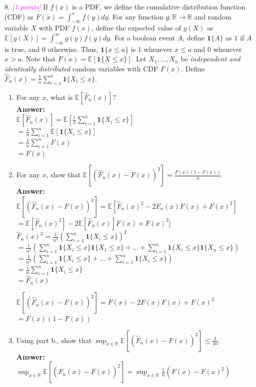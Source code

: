 \documentclass{article}
\newcommand{\field}[1]{\mathbb{#1}}
\newcommand{\1}{\mathbf{1}}
\newcommand{\E}{\mathbb{E}}
\newcommand{\R}{\field{R}} %
\newcommand{\grade}[1]{\small\textcolor{magenta}{\emph{[#1 points]}} \normalsize}
\begin{document}
8. \grade{1} If $f(x)$ is a PDF, we define the cumulative distribution function (CDF) as $F(x) = \int_{-\infty}^x f(y) dy$.
For any function $g : \R \rightarrow \R$ and random variable $X$ with PDF $f(x)$, define the expected value of $g(X)$ as $\E[g(X)] = \int_{-\infty}^\infty g(y) f(y) dy$. For a boolean event $A$, define $\1\{ A \}$ as $1$ if $A$ is true, and $0$ otherwise. Thus, $\1\{ x \leq a \}$ is $1$ whenever $x \leq a$ and $0$ whenever $x > a$. 
Note that $F(x) = \E[\1\{X \leq x\}]$.
Let $X_1,\dots,X_n$ be \emph{independent and identically distributed} random variables with CDF $F(x)$. 
Define $\widehat{F}_n(x) = \frac{1}{n} \sum_{i=1}^n \1\{X_i \leq x\}$.
\begin{enumerate}
	\item For any $x$, what is $\E[ \widehat{F}_n(x) ]$?\\
	\textbf{Answer:}\\
	$\E[ \widehat{F}_n(x) ]=\E[\frac{1}{n}  \sum_{i=1}^n \1 \{X_i\leq x \}]$\\
	$=\frac{1}{n}  \sum_{i=1}^n \E[\1 \{X_i\leq x \}]$\\
	$=\frac{1}{n}  \sum_{i=1}^n F(x)$\\
	$=F(x)$\\
	
	\item For any $x$, show that $\E[ ( \widehat{F}_n(x) - F(x) )^2 ] = \frac{F(x)(1-F(x))}{n}$\\
	\textbf{Answer:}\\
	$\E[ ( \widehat{F}_n(x) - F(x) )^2 ]=\E[  \widehat{F}_n(x)^2 -2\widehat{F}_n(x) F(x)+ F(x)^2 ]  $\\
	$=\E[  \widehat{F}_n(x)^2] -2\E[\widehat{F}_n(x)] F(x)+ F(x)^2 ] $\\
	
	 $\widehat{F}_n(x)^2=\frac{1}{n^2}(\sum_{i=1}^n \1\{X_i \leq x\})^2$\\
	 $=\frac{1}{n^2}(\sum_{i=1}^n \1\{X_i \leq x\}\1\{X_1 \leq x\}+...+\sum_{i=1}^n \1\{X_i \leq x\}\1\{X_n \leq x\})$\\
	 $=\frac{1}{n^2}(\sum_{i=1}^n \1\{X_i \leq x\}+...+\sum_{i=1}^n \1\{X_i \leq x\})$\\
	 $=\frac{1}{n}\sum_{i=1}^n \1\{X_i \leq x\}$\\
	 $=\widehat{F}_n(x)$
	 
	 $\E[ ( \widehat{F}_n(x) - F(x) )^2 ]=F(x)-2F(x)F(x)+F(x)^2$\\
	 $=F(x)(1-F(x))$\\
	
	\item Using part b., show that $\displaystyle\sup_{x \in \R} \E[ ( \widehat{F}_n(x) - F(x) )^2 ] \leq \tfrac{1}{4n}$. \\
	\textbf{Answer:}\\
	$\displaystyle\sup_{x \in \R} \E[ ( \widehat{F}_n(x) - F(x) )^2 ] =\displaystyle\sup_{x \in \R} \frac{1}{n} (F(x)-F(x)^2)$\\
	

\end{enumerate}
\end{document}
